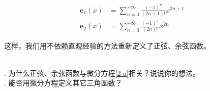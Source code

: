 \documentclass[12pt,UTF8]{ctexbook}
\begin{document}
\begin{appendix}
\begin{align*}
    \mathbf{e}_1(x) &= \sum_{n=0}^{+\infty} \frac{(-1)^n}{(2n+1)!} x^{2n+1} \\
    \mathbf{e}_2(x) &= \sum_{n=0}^{+\infty} \frac{(-1)^n}{(2n)!} x^{2n} 
\end{align*}

这样，我们用不依赖直观经验的方法重新定义了正弦、余弦函数。

\begin{sk}
    \mbox{} \\
    . 为什么正弦、余弦函数与微分方程\eqref{2-a}相关？说说你的想法。\\
    . 能否用微分方程定义其它三角函数？
\end{sk}

\end{appendix}
\end{document}
